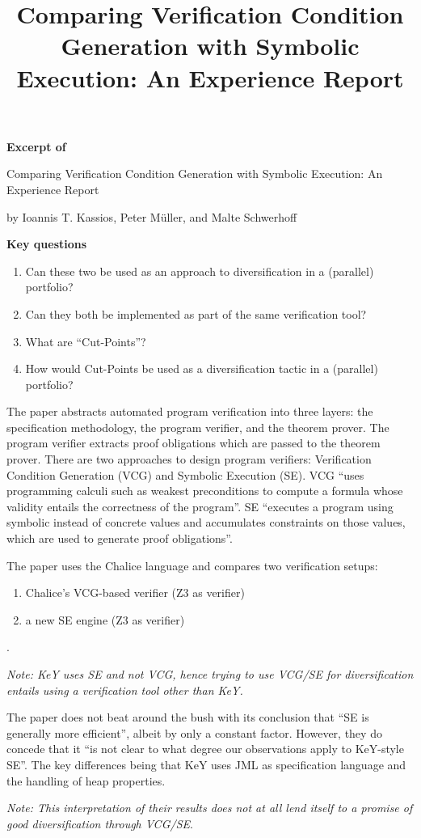 \documentclass{scrartcl}
\title{Comparing Verification Condition Generation with Symbolic Execution: An Experience Report}
\begin{document}
\begin{center}
    \Large{\textbf{Excerpt of}}

    \LARGE{Comparing Verification Condition Generation
    with Symbolic Execution: An Experience Report}

    \large{by Ioannis T. Kassios, Peter Müller, and Malte Schwerhoff}
\end{center}

\vspace{1cm}

\begin{addmargin}[0.2\linewidth]{0.2\linewidth}
    \begin{center}
        \textbf{Key questions}
    \end{center}
    \begin{enumerate}[i]
        \item Can these two be used as an approach to diversification in a (parallel) portfolio?
        \item Can they both be implemented as part of the same verification tool?
        \item What are \enquote{Cut-Points}?
        \item How would Cut-Points be used as a diversification tactic in a (parallel) portfolio?
    \end{enumerate}
\end{addmargin}

\vspace{1cm}

The paper abstracts automated program verification into three layers:
the specification methodology, the program verifier, and the theorem prover.
The program verifier extracts proof obligations which are passed to the theorem prover.
There are two approaches to design program verifiers:
Verification Condition Generation (VCG) and Symbolic Execution (SE).
VCG \enquote{uses programming calculi such as weakest preconditions
to compute a formula whose validity entails the correctness of the program}.
SE \enquote{executes a program using symbolic instead
of concrete values and accumulates constraints on those values, which are
used to generate proof obligations}.

The paper uses the Chalice language and compares two verification setups:
\begin{enumerate}
    \item Chalice's VCG-based verifier (Z3 as verifier)
    \item a new SE engine (Z3 as verifier)
\end{enumerate}.

\textit{Note: KeY uses SE and not VCG, hence trying to use VCG/SE for diversification entails
using a verification tool other than KeY.}

The paper does not beat around the bush with its conclusion that
\enquote{SE is generally more efficient}, albeit by only a constant factor.
However, they do concede that it \enquote{is not clear to what degree our observations
apply to KeY-style SE}.
The key differences being that KeY uses JML as specification language
and the handling of heap properties.

\textit{Note: This interpretation of their results does not at all lend itself
    to a promise of good diversification through VCG/SE}.
\end{document}
